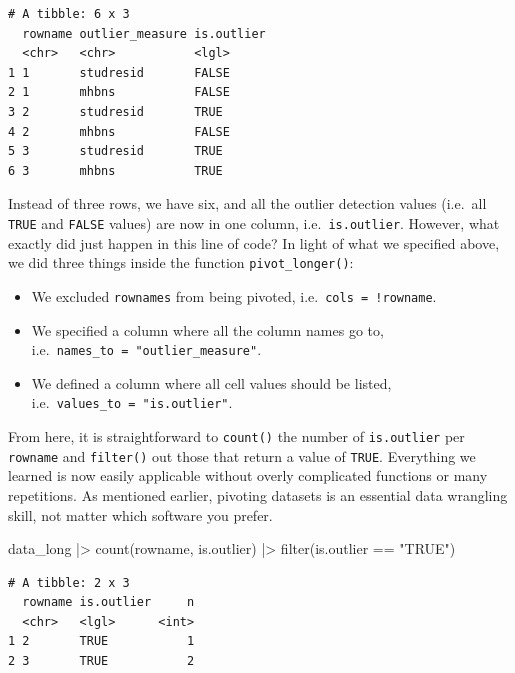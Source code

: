 \documentclass[
  letterpaper,
]{krantz}
\makeatletter
\newenvironment{Shaded}{\begin{snugshade}}{\end{snugshade}}
\newcommand{\FunctionTok}[1]{\textcolor[rgb]{0.28,0.35,0.67}{#1}}
\newcommand{\NormalTok}[1]{\textcolor[rgb]{0.00,0.23,0.31}{#1}}
\newcommand{\SpecialCharTok}[1]{\textcolor[rgb]{0.37,0.37,0.37}{#1}}
\newcommand{\StringTok}[1]{\textcolor[rgb]{0.13,0.47,0.30}{#1}}
\newenvironment{kframe}{%
\medskip{}
\setlength{\fboxsep}{.8em}
 \def\at@end@of@kframe{}%
 \ifinner\ifhmode%
  \def\at@end@of@kframe{\end{minipage}}%
  \begin{minipage}{\columnwidth}%
 \fi\fi%
 \def\FrameCommand##1{\hskip\@totalleftmargin \hskip-\fboxsep
 \colorbox{shadecolor}{##1}\hskip-\fboxsep
     \hskip-\linewidth \hskip-\@totalleftmargin \hskip\columnwidth}%
 \MakeFramed {\advance\hsize-\width
   \@totalleftmargin\z@ \linewidth\hsize
   \@setminipage}}%
 {\par\unskip\endMakeFramed%
 \at@end@of@kframe}
\renewenvironment{Shaded}{\begin{kframe}}{\end{kframe}}
\makeatother
\begin{document}
\begin{verbatim}
# A tibble: 6 x 3
  rowname outlier_measure is.outlier
  <chr>   <chr>           <lgl>     
1 1       studresid       FALSE     
2 1       mhbns           FALSE     
3 2       studresid       TRUE      
4 2       mhbns           FALSE     
5 3       studresid       TRUE      
6 3       mhbns           TRUE      
\end{verbatim}

Instead of three rows, we have six, and all the outlier detection values
(i.e.~all \texttt{TRUE} and \texttt{FALSE} values) are now in one
column, i.e.~\texttt{is.outlier}. However, what exactly did just happen
in this line of code? In light of what we specified above, we did three
things inside the function \texttt{pivot\_longer()}:

\begin{itemize}
\item
  We excluded \texttt{rownames} from being pivoted,
  i.e.~\texttt{cols\ =\ !rowname}.
\item
  We specified a column where all the column names go to,
  i.e.~\texttt{names\_to\ =\ "outlier\_measure"}.
\item
  We defined a column where all cell values should be listed,
  i.e.~\texttt{values\_to\ =\ "is.outlier"}.
\end{itemize}

From here, it is straightforward to \texttt{count()} the number of
\texttt{is.outlier} per \texttt{rowname} and \texttt{filter()} out those
that return a value of \texttt{TRUE}. Everything we learned is now
easily applicable without overly complicated functions or many
repetitions. As mentioned earlier, pivoting datasets is an essential
data wrangling skill, not matter which software you prefer.

\begin{Shaded}
\begin{Highlighting}[]
\NormalTok{data\_long }\SpecialCharTok{|\textgreater{}}
  \FunctionTok{count}\NormalTok{(rowname, is.outlier) }\SpecialCharTok{|\textgreater{}}
  \FunctionTok{filter}\NormalTok{(is.outlier }\SpecialCharTok{==} \StringTok{"TRUE"}\NormalTok{)}
\end{Highlighting}
\end{Shaded}

\begin{verbatim}
# A tibble: 2 x 3
  rowname is.outlier     n
  <chr>   <lgl>      <int>
1 2       TRUE           1
2 3       TRUE           2
\end{verbatim}
\end{document}
